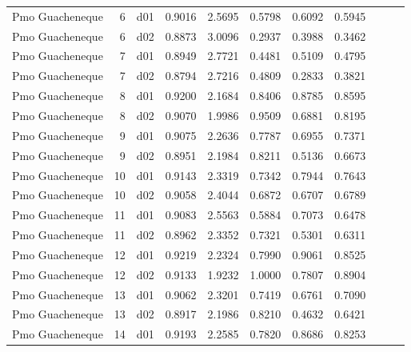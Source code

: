 \begin{landscape}
\begin{longtable}{p{2cm}rrrrrrrrrr}
      Pmo Guacheneque  &          6 &     d01 &   0.9016 &  2.5695 &        0.5798 &           0.6092 &  0.5945 \\
      Pmo Guacheneque  &          6 &     d02 &   0.8873 &  3.0096 &        0.2937 &           0.3988 &  0.3462 \\
      Pmo Guacheneque  &          7 &     d01 &   0.8949 &  2.7721 &        0.4481 &           0.5109 &  0.4795 \\
      Pmo Guacheneque  &          7 &     d02 &   0.8794 &  2.7216 &        0.4809 &           0.2833 &  0.3821 \\
      Pmo Guacheneque  &          8 &     d01 &   0.9200 &  2.1684 &        0.8406 &           0.8785 &  0.8595 \\
      Pmo Guacheneque  &          8 &     d02 &   0.9070 &  1.9986 &        0.9509 &           0.6881 &  0.8195 \\
      Pmo Guacheneque  &          9 &     d01 &   0.9075 &  2.2636 &        0.7787 &           0.6955 &  0.7371 \\
      Pmo Guacheneque  &          9 &     d02 &   0.8951 &  2.1984 &        0.8211 &           0.5136 &  0.6673 \\
      Pmo Guacheneque  &         10 &     d01 &   0.9143 &  2.3319 &        0.7342 &           0.7944 &  0.7643 \\
      Pmo Guacheneque  &         10 &     d02 &   0.9058 &  2.4044 &        0.6872 &           0.6707 &  0.6789 \\
      Pmo Guacheneque  &         11 &     d01 &   0.9083 &  2.5563 &        0.5884 &           0.7073 &  0.6478 \\
      Pmo Guacheneque  &         11 &     d02 &   0.8962 &  2.3352 &        0.7321 &           0.5301 &  0.6311 \\
      Pmo Guacheneque  &         12 &     d01 &   0.9219 &  2.2324 &        0.7990 &           0.9061 &  0.8525 \\
      Pmo Guacheneque  &         12 &     d02 &   0.9133 &  1.9232 &        1.0000 &           0.7807 &  0.8904 \\
      Pmo Guacheneque  &         13 &     d01 &   0.9062 &  2.3201 &        0.7419 &           0.6761 &  0.7090 \\
      Pmo Guacheneque  &         13 &     d02 &   0.8917 &  2.1986 &        0.8210 &           0.4632 &  0.6421 \\
      Pmo Guacheneque  &         14 &     d01 &   0.9193 &  2.2585 &        0.7820 &           0.8686 &  0.8253 \\

\end{longtable}
\end{landscape}
